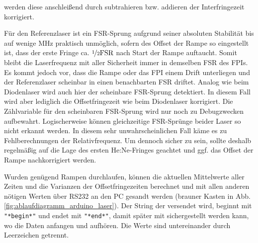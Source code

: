 werden diese anschleißend durch subtrahieren bzw. addieren der Interfringezeit
korrigiert.\par
Für den Referenzlaser ist ein FSR-Sprung aufgrund seiner absoluten Stabilität
bis auf wenige MHz praktisch unmöglich, sofern des Offset der Rampe so
eingestellt ist, dass der erste Fringe ca.
$\nicefrac{1}{2}\text{FSR}$ nach Start der Rampe auftaucht. Somit bleibt die
Laserfrequenz mit aller Sicherheit immer in demselben FSR des FPIs. Es
kommt jedoch vor, dass die Rampe oder das FPI einem Drift unterliegen
und der Referenzlaser scheinbar in einen benachbarten FSR driftet.
Analog wie beim Diodenlaser wird auch hier der scheinbare FSR-Sprung
detektiert. In diesem Fall wird aber lediglich die Offsetfringezeit wie beim
Diodenlaser korrigiert. Die Zählvariable für den scheinbaren FSR-Sprung
wird nur noch zu Debugzwecken aufbewahrt. Logischerweise können
gleichzeitige FSR-Sprünge beider Laser so nicht erkannt werden. In diesem
sehr unwahrscheinlichen Fall käme es zu Fehlberechnungen der Relativfrequenz.
Um dennoch sicher zu sein, sollte deshalb regelmäßig auf die Lage des ersten
He:Ne-Fringes geachtet und ggf. das Offset der Rampe nachkorrigiert werden.\par
Wurden genügend Rampen durchlaufen, können die aktuellen Mittelwerte aller
Zeiten und die Varianzen der Offsetfringezeiten berechnet und mit allen anderen nötigen Werten über RS232 an den PC gesandt werden (brauner Kasten in Abb.
\ref{fig:ablaufdiagramm_arduino_laser}). Der String der versendet wird, beginnt
mit \lstinline|"*begin*"| und endet mit \lstinline|"*end*"|, damit später mit
sichergestellt werden kann, wo die Daten anfangen und aufhören. Die Werte sind
untereinander durch Leerzeichen getrennt.


